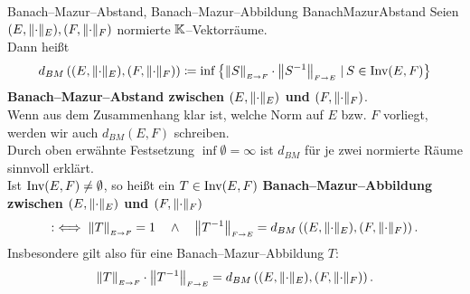 \begin{definition}{Banach--Mazur--Abstand, Banach--Mazur--Abbildung}
                  {BanachMazurAbstand}
Seien $(E, \lVert\cdot\rVert_E), (F, \lVert\cdot\rVert_F)$ normierte $\mathbb{K}$--Vektorräume.\\
Dann heißt
\[d_{BM}\left( (E, \lVert\cdot\rVert_E), (F, \lVert\cdot\rVert_F) \right) \coloneqq
\inf\left\{\left\|S\right\|_{\scriptscriptstyle{E \rightarrow F}} \cdot \left\|S^{-1}\right\|_{\scriptscriptstyle{F \rightarrow E}}\,|\,S \in \mathop{\textrm{Inv}}\nolimits(E, F)\right\}\]
\textbf{Banach--Mazur--Abstand zwischen $(E, \lVert\cdot\rVert_E)$ und 
$(F, \lVert\cdot\rVert_F)$}.\\
Wenn aus dem Zusammenhang klar ist, welche Norm auf $E$ bzw. $F$ vorliegt,
werden wir auch $d_{BM}(E,F)$ schreiben.\\
Durch oben erwähnte Festsetzung $\inf \emptyset = \infty$ ist $d_{BM}$ für je
zwei normierte Räume sinnvoll erklärt.\\
Ist $\mathop{\textrm{Inv}}\nolimits(E, F) \neq \emptyset$, so heißt ein $T \in \mathop{\textrm{Inv}}\nolimits(E, F)$ \textbf{Banach--Mazur--Abbildung zwischen $(E, \lVert\cdot\rVert_E)$ und 
$(F, \lVert\cdot\rVert_F)$}
\[:\iff \left\|T\right\|_{\scriptscriptstyle{E \rightarrow F}} = 1 \quad \wedge \quad 
\left\|T^{-1}\right\|_{\scriptscriptstyle{F \rightarrow E}} 
 = d_{BM}\left( (E, \lVert\cdot\rVert_E), (F, \lVert\cdot\rVert_F) \right)\text.\]
Insbesondere gilt also für eine Banach--Mazur--Abbildung $T$:
\[\left\|T\right\|_{\scriptscriptstyle{E \rightarrow F}} \cdot \left\|T^{-1}\right\|_{\scriptscriptstyle{F \rightarrow E}} 
= d_{BM}\left( (E, \lVert\cdot\rVert_E), (F, \lVert\cdot\rVert_F) \right)\text.\]
\end{definition}